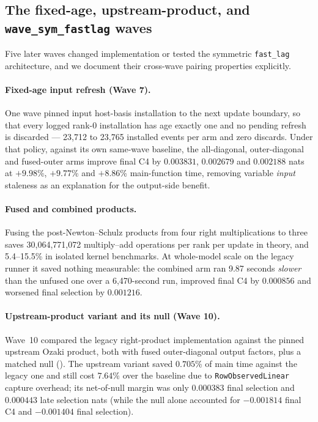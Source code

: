 \subsection{The fixed-age, upstream-product, and \texttt{wave\_sym\_fastlag} waves}
\label{app:systems}

Five later waves changed implementation or tested the symmetric \texttt{fast\_lag}
architecture, and we document their cross-wave pairing properties explicitly.

\paragraph{Fixed-age input refresh (Wave 7).}
One wave pinned input host-basis installation to the next update boundary, so
that every logged rank-0 installation has age exactly one and no pending
refresh is discarded --- 23{,}712 to 23{,}765 installed events per arm and zero
discards. Under that policy, against its own same-wave baseline, the
all-diagonal, outer-diagonal and fused-outer arms improve final C4 by
$0.003831$, $0.002679$ and $0.002188$ nats at $+9.98$\%, $+9.77$\% and
$+8.86$\% main-function time, removing variable \emph{input} staleness as an
explanation for the output-side benefit.

\paragraph{Fused and combined products.}
Fusing the post-Newton--Schulz products from four right multiplications to
three saves 30{,}064{,}771{,}072 multiply--add operations per rank per update in
theory, and 5.4--15.5\% in isolated kernel benchmarks. At whole-model scale on
the legacy runner it saved nothing measurable: the combined arm ran 9.87 seconds
\emph{slower} than the unfused one over a 6{,}470-second run, improved final C4
by $0.000856$ and worsened final selection by $0.001216$.

\paragraph{Upstream-product variant and its null (Wave 10).}
Wave~10 compared the legacy right-product implementation against the pinned
upstream Ozaki product, both with fused outer-diagonal output factors, plus a
matched null (). The upstream variant saved $0.705$\% of main
time against the legacy one and still cost $7.64$\% over the baseline due to
\texttt{RowObservedLinear} capture overhead; its net-of-null margin was only
$0.000383$ final selection and $0.000443$ late selection nats (while the null
alone accounted for $-0.001814$ final C4 and $-0.001404$ final selection).

